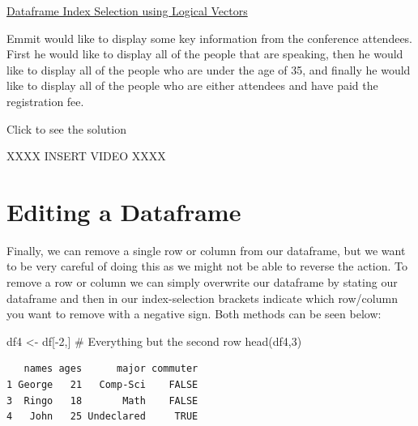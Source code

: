 \documentclass[
  letterpaper,
  DIV=11,
  numbers=noendperiod]{scrreprt}
\newenvironment{Shaded}{\begin{snugshade}}{\end{snugshade}}
\newcommand{\CommentTok}[1]{\textcolor[rgb]{0.37,0.37,0.37}{#1}}
\newcommand{\DecValTok}[1]{\textcolor[rgb]{0.68,0.00,0.00}{#1}}
\newcommand{\FunctionTok}[1]{\textcolor[rgb]{0.28,0.35,0.67}{#1}}
\newcommand{\NormalTok}[1]{\textcolor[rgb]{0.00,0.23,0.31}{#1}}
\newcommand{\OtherTok}[1]{\textcolor[rgb]{0.00,0.23,0.31}{#1}}
\newcommand{\SpecialCharTok}[1]{\textcolor[rgb]{0.37,0.37,0.37}{#1}}
\begin{document}
\begin{watch}{}{}
    \href{https://youtu.be/hksRGX-YT6w}{Dataframe Index Selection using Logical Vectors}
\end{watch}

\begin{tcolorbox}[enhanced jigsaw, colbacktitle=quarto-callout-tip-color!10!white, breakable, bottomrule=.15mm, colframe=quarto-callout-tip-color-frame, left=2mm, opacitybacktitle=0.6, title=\textcolor{quarto-callout-tip-color}{\faLightbulb}\hspace{0.5em}{Try it Out}, leftrule=.75mm, opacityback=0, rightrule=.15mm, titlerule=0mm, bottomtitle=1mm, colback=white, toprule=.15mm, arc=.35mm, toptitle=1mm, coltitle=black]

Emmit would like to display some key information from the conference
attendees. First he would like to display all of the people that are
speaking, then he would like to display all of the people who are under
the age of 35, and finally he would like to display all of the people
who are either attendees and have paid the registration fee.

Click to see the solution

XXXX INSERT VIDEO XXXX

\end{tcolorbox}

\section{Editing a Dataframe}\label{editing-a-dataframe}

Finally, we can remove a single row or column from our dataframe, but we
want to be very careful of doing this as we might not be able to reverse
the action. To remove a row or column we can simply overwrite our
dataframe by stating our dataframe and then in our index-selection
brackets indicate which row/column you want to remove with a negative
sign. Both methods can be seen below:

\begin{Shaded}
\begin{Highlighting}[]
\NormalTok{df4 }\OtherTok{\textless{}{-}}\NormalTok{ df[}\SpecialCharTok{{-}}\DecValTok{2}\NormalTok{,] }\CommentTok{\# Everything but the second row}
\FunctionTok{head}\NormalTok{(df4,}\DecValTok{3}\NormalTok{)}
\end{Highlighting}
\end{Shaded}

\begin{verbatim}
   names ages      major commuter
1 George   21   Comp-Sci    FALSE
3  Ringo   18       Math    FALSE
4   John   25 Undeclared     TRUE
\end{verbatim}
\end{document}
